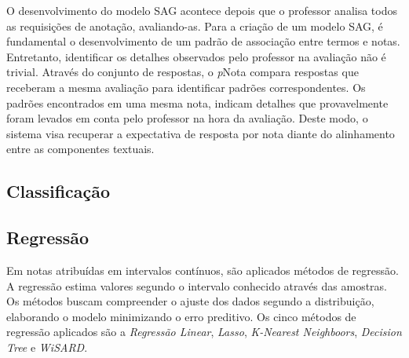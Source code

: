 \begin{minipage}[!h]{0.45\textwidth}
 O desenvolvimento do modelo SAG acontece depois que o professor analisa todos as requisições de anotação, avaliando-as. Para a criação de um modelo SAG, é fundamental o desenvolvimento de um padrão de associação entre termos e notas. Entretanto, identificar os detalhes observados pelo professor na avaliação não é trivial. Através do conjunto de respostas, o \textit{p}Nota compara respostas que receberam a mesma avaliação para identificar padrões correspondentes. Os padrões encontrados em uma mesma nota, indicam detalhes que provavelmente foram levados em conta pelo professor na hora da avaliação. Deste modo, o sistema visa recuperar a expectativa de resposta por nota diante do alinhamento entre as componentes textuais.

\begin{comment}

Para reconhecimento de padrões, combinamos três modelos de notas com a avaliação automática. Em notas discretas e graduais utilizamos algoritmos de classificação. Enquanto isso, em notas contínuas usamos algoritmos de regressão. Em ambos os casos, os métodos aplicam aprendizado supervisionado, treinando através das notas dadas pelo professor os algoritmos.
\end{comment}

\subsection{Classificação}

\subsection{Regressão}

Em notas atribuídas em intervalos contínuos, são aplicados métodos de regressão. A regressão estima valores segundo o intervalo conhecido através das amostras. Os métodos buscam compreender o ajuste dos dados segundo a distribuição, elaborando o modelo minimizando o erro preditivo. Os cinco métodos de regressão aplicados são a \textit{Regressão Linear}, \textit{Lasso}, \textit{K-Nearest Neighboors}, \textit{Decision Tree} e \textit{WiSARD}.


\end{minipage}
